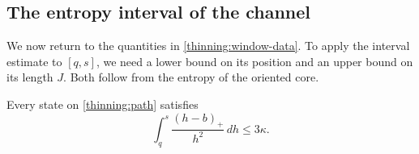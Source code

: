 \subsection{The entropy interval of the channel}

We now return to the quantities in \eqref{thinning:window-data}.
To apply the interval estimate to $[q,s]$, we need a lower bound
on its position and an upper bound on its length $J$. Both follow
from the entropy of the oriented core.

\begin{lemma}
\label{thinning:window}
Every state on \eqref{thinning:path} satisfies
\begin{equation}
\label{thinning:window-bound}
 \int_q^s\frac{(h-b)_+}{h^2}\,dh\le3\kappa.
\end{equation}
\end{lemma}

